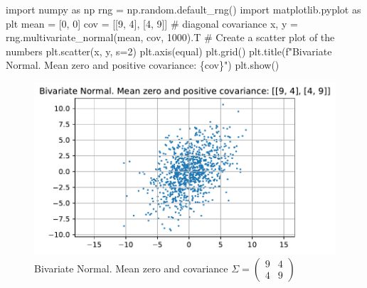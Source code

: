 \documentclass[
  letterpaper,
  DIV=11,
  numbers=noendperiod]{scrreprt}
\newenvironment{Shaded}{\begin{snugshade}}{\end{snugshade}}
\newcommand{\CommentTok}[1]{\textcolor[rgb]{0.37,0.37,0.37}{#1}}
\newcommand{\DecValTok}[1]{\textcolor[rgb]{0.68,0.00,0.00}{#1}}
\newcommand{\ImportTok}[1]{\textcolor[rgb]{0.00,0.46,0.62}{#1}}
\newcommand{\NormalTok}[1]{\textcolor[rgb]{0.00,0.23,0.31}{#1}}
\newcommand{\OperatorTok}[1]{\textcolor[rgb]{0.37,0.37,0.37}{#1}}
\newcommand{\SpecialCharTok}[1]{\textcolor[rgb]{0.37,0.37,0.37}{#1}}
\newcommand{\SpecialStringTok}[1]{\textcolor[rgb]{0.13,0.47,0.30}{#1}}
\newcommand{\StringTok}[1]{\textcolor[rgb]{0.13,0.47,0.30}{#1}}
\begin{document}
\begin{Shaded}
\begin{Highlighting}[]
\ImportTok{import}\NormalTok{ numpy }\ImportTok{as}\NormalTok{ np}
\NormalTok{rng }\OperatorTok{=}\NormalTok{ np.random.default\_rng()}
\ImportTok{import}\NormalTok{ matplotlib.pyplot }\ImportTok{as}\NormalTok{ plt}
\NormalTok{mean }\OperatorTok{=}\NormalTok{ [}\DecValTok{0}\NormalTok{, }\DecValTok{0}\NormalTok{]}
\NormalTok{cov }\OperatorTok{=}\NormalTok{ [[}\DecValTok{9}\NormalTok{, }\DecValTok{4}\NormalTok{], [}\DecValTok{4}\NormalTok{, }\DecValTok{9}\NormalTok{]]  }\CommentTok{\# diagonal covariance}
\NormalTok{x, y }\OperatorTok{=}\NormalTok{ rng.multivariate\_normal(mean, cov, }\DecValTok{1000}\NormalTok{).T}
\CommentTok{\# Create a scatter plot of the numbers}
\NormalTok{plt.scatter(x, y, s}\OperatorTok{=}\DecValTok{2}\NormalTok{)}
\NormalTok{plt.axis(}\StringTok{\textquotesingle{}equal\textquotesingle{}}\NormalTok{)}
\NormalTok{plt.grid()}
\NormalTok{plt.title(}\SpecialStringTok{f"Bivariate Normal. Mean zero and positive covariance: }\SpecialCharTok{\{}\NormalTok{cov}\SpecialCharTok{\}}\SpecialStringTok{"}\NormalTok{)}
\NormalTok{plt.show()}
\end{Highlighting}
\end{Shaded}

\begin{figure}[H]

{\centering \includegraphics{006_num_gp_files/figure-pdf/fig-bi9040-output-1.pdf}

}

\caption{\label{fig-bi9040}Bivariate Normal. Mean zero and covariance
\(\Sigma=\begin{pmatrix} 9 & 4 \\ 4 & 9\end{pmatrix}\)}

\end{figure}
\end{document}
